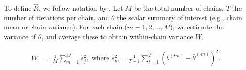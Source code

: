 \documentclass[article]{jss}
\begin{document}
%
%
%
%

To define $\widehat{R}$, we follow notation by \cite[p.~5]{veht19}. %
Let $M$ be the total number of chains, $T$ the number of iterations per chain, and $\theta$ the scalar summary of interest (e.g., chain mean or chain variance). For each chain ($m = 1, 2, \dots, M$), we estimate the variance of $\theta$, and average these to obtain within-chain variance $W$.


\begin{align*}
W&=\frac{1}{M} \sum_{m=1}^{M} s_{j}^{2},  \text { where } s_{m}^{2}=\frac{1}{T-1} \sum_{t=1}^{T}\left(\theta^{(t m)}-\bar{\theta}^{(\cdot m)}\right)^{2}. %
\end{align*}
\end{document}
